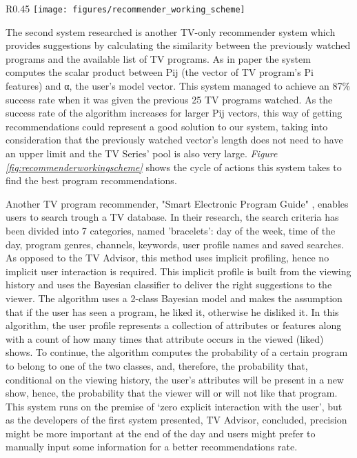\begin{wrapfigure}{R}{0.45\textwidth}
\centering
\texttt{[image: figures/recommender\_working\_scheme]}
\caption{Recommender working scheme \newline Source: "Towards TV Recommender System: \newline Experiments with User Modeling"}
\vspace{-1em}
\label{fig:recommenderworkingscheme}
\end{wrapfigure}

The second system researched is another TV-only recommender system which provides suggestions by calculating the similarity between the previously watched programs and the available list of TV programs. As in paper \cite{14} the system computes the scalar product between Pij (the vector of TV program's Pi features) and α, the user's model vector. This system managed to achieve an 87\% success rate when it was given the previous 25 TV programs watched. As the success rate of the algorithm increases for larger Pij vectors, this way of getting recommendations could represent a good solution to our system, taking into consideration that the previously watched vector's length does not need to have an upper limit and the TV Series' pool is also very large. \textit{Figure \ref{fig:recommenderworkingscheme}} shows the cycle of actions this system takes to find the best program recommendations.

Another TV program recommender, "Smart Electronic Program Guide" \cite{7}, enables users to search trough a TV database. In their research, the search criteria has been divided into 7 categories, named 'bracelets': day of the week, time of the
day, program genres, channels, keywords, user profile
names and saved searches. As opposed to the TV Advisor, this method uses implicit profiling, hence no implicit user interaction is required. This implicit profile is built from the viewing history and uses the Bayesian classifier to deliver the right suggestions to the viewer. The algorithm uses a 2-class Bayesian model and makes the assumption that if the user has seen a program, he liked it, otherwise he disliked it. In this algorithm, the user profile represents a collection of attributes or features along with a count of how many times that attribute occurs in the viewed (liked) shows. To continue, the algorithm computes the probability of a certain program to belong to one of the two classes, and, therefore, the probability that, conditional on the viewing history, the user's attributes will be present in a new show, hence, the probability that the viewer will or will not like that program. This system runs on the premise of ‘zero explicit interaction with the user', but as the developers of the first system presented, TV Advisor, concluded, precision might be more important at the end of the day and users might prefer to manually input some information for a better recommendations rate.

